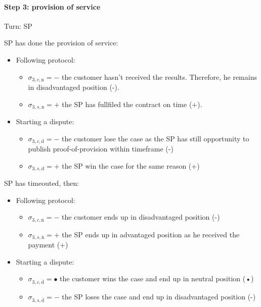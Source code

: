 \documentclass{ieeeaccess}
\begin{document}
\paragraph{Step 3: provision of
service}\label{step-3-provision-of-service}

Turn: SP

SP has done the provision of service:

\begin{itemize}
\item
  Following protocol:

  \begin{itemize}
  
  \item
    \(\sigma_{3, c, \mathrm{n}} = -\) the customer hasn't received the
    results. Therefore, he remains in disadvantaged position (-).
  \item
    \(\sigma_{3, s, \mathrm{n}} = +\) the SP has fullfiled the contract
    on time (+).
  \end{itemize}
\item
  Starting a dispute:

  \begin{itemize}
  
  \item
    \(\sigma_{3, c, \mathrm{d}} = -\) the customer lose the case as the
    SP has still opportunity to publish proof-of-provision within
    timeframe (-)
  \item
    \(\sigma_{3, s, \mathrm{d}} = +\) the SP win the case for the same
    reason (+)
  \end{itemize}
\end{itemize}

SP has timeouted, then:

\begin{itemize}
\item
  Following protocol:

  \begin{itemize}
  
  \item
    \(\sigma_{3, c, \overline{\mathrm{n}}} = -\) the customer ends up in
    disadvantaged position (-)
  \item
    \(\sigma_{3, s, \overline{\mathrm{n}}} = +\) the SP ends up in
    advantaged position as he received the payment (+)
  \end{itemize}
\item
  Starting a dispute:

  \begin{itemize}
  
  \item
    \(\sigma_{3, c, \overline{\mathrm{d}}} = •\) the customer wins the
    case and end up in neutral position (•)
  \item
    \(\sigma_{3, s, \overline{\mathrm{d}}} = -\) the SP loses the case
    and end up in disadvantaged position (-)
  \end{itemize}
\end{itemize}
\end{document}
